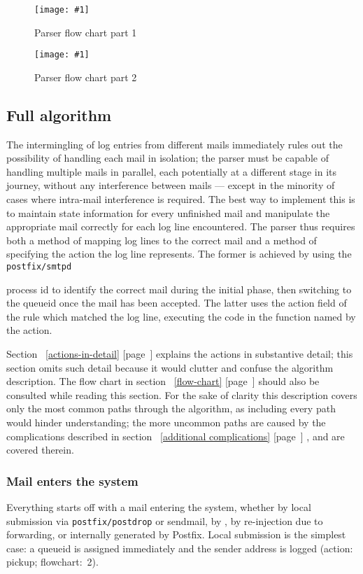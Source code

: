 \documentclass[a4paper,12pt,draft]{article}
\newcommand{\showgraph}[3]{
    \begin{figure}[hbt!]
        \caption{#2}\label{#3}
        \texttt{[image: \#1]}
    \end{figure}
}
\newcommand{\refwithpage}[1]{%
    \empty{}\ref{#1} [page~\pageref{#1}]%
}
\newcommand{\daemon}[1]{%
    \texttt{postfix/#1}%
}
\begin{document}
\showgraph{build/logparser-flow-chart-part-1}{Parser flow chart part
1}{flow chart image part 1}

\showgraph{build/logparser-flow-chart-part-2}{Parser flow chart part
2}{flow chart image part 2}

\clearpage

\subsection{Full algorithm}

\label{full-algorithm}

The intermingling of log entries from different mails immediately rules out
the possibility of handling each mail in isolation; the parser must be
capable of handling multiple mails in parallel, each potentially at a
different stage in its journey, without any interference between mails ---
except in the minority of cases where intra-mail interference is required.
The best way to implement this is to maintain state information for every
unfinished mail and manipulate the appropriate mail correctly for each log
line encountered.  The parser thus requires both a method of mapping log
lines to the correct mail and a method of specifying the action the log
line represents.  The former is achieved by using the \daemon{smtpd}
process id to identify the correct mail during the initial phase, then
switching to the queueid once the mail has been accepted.  The latter uses
the action field of the rule which matched the log line, executing the code
in the function named by the action.

Section~\refwithpage{actions-in-detail} explains the actions in substantive
detail; this section omits such detail because it would clutter and confuse
the algorithm description.  The flow chart in
section~\refwithpage{flow-chart} should also be consulted while reading
this section.  For the sake of clarity this description covers only the
most common paths through the algorithm, as including every path would
hinder understanding; the more uncommon paths are caused by the
complications described in section~\refwithpage{additional complications},
and are covered therein.

\subsubsection{Mail enters the system}

\label{mail-enters-the-system}

Everything starts off with a mail entering the system, whether by local
submission via \daemon{postdrop} or sendmail, by \SMTP{}, by re-injection
due to forwarding, or internally generated by Postfix.  Local submission is
the simplest case: a queueid is assigned immediately and the sender address
is logged (action: pickup; flowchart:~2).
\end{document}
